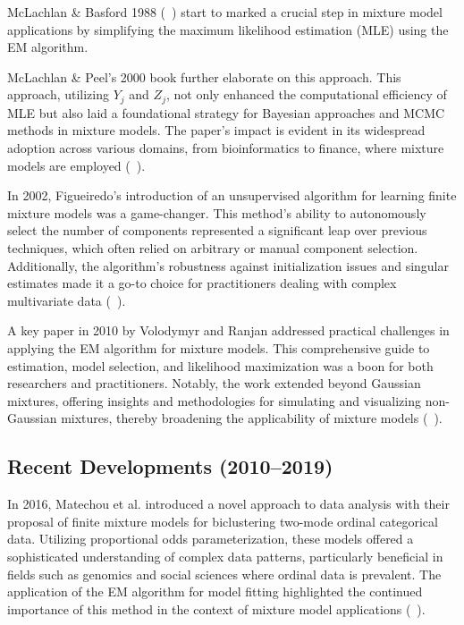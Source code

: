 \documentclass{article}
\begin{document}
McLachlan \& Basford 1988 (~\cite{mclachlan1988mixture}) start to marked a crucial step in mixture model applications by simplifying the maximum likelihood estimation (MLE) using the EM algorithm.

McLachlan \& Peel's 2000 book further elaborate on this approach. This approach, utilizing $Y_j$ and $Z_j$, not only enhanced the computational efficiency of MLE but also laid a foundational strategy for Bayesian approaches and MCMC methods in mixture models. The paper’s impact is evident in its widespread adoption across various domains, from bioinformatics to finance, where mixture models are employed (~\cite{mclachlan2000finite}).

In 2002, Figueiredo's introduction of an unsupervised algorithm for learning finite mixture models was a game-changer. This method's ability to autonomously select the number of components represented a significant leap over previous techniques, which often relied on arbitrary or manual component selection. Additionally, the algorithm's robustness against initialization issues and singular estimates made it a go-to choice for practitioners dealing with complex multivariate data (~\cite{figueiredo2002unsupervised}).

A key paper in 2010 by Volodymyr and Ranjan addressed practical challenges in applying the EM algorithm for mixture models. This comprehensive guide to estimation, model selection, and likelihood maximization was a boon for both researchers and practitioners. Notably, the work extended beyond Gaussian mixtures, offering insights and methodologies for simulating and visualizing non-Gaussian mixtures, thereby broadening the applicability of mixture models (~\cite{10.1214/09-SS053}).

\subsection*{Recent Developments (2010--2019)}

In 2016, Matechou et al. introduced a novel approach to data analysis with their proposal of finite mixture models for biclustering two-mode ordinal categorical data. Utilizing proportional odds parameterization, these models offered a sophisticated understanding of complex data patterns, particularly beneficial in fields such as genomics and social sciences where ordinal data is prevalent. The application of the EM algorithm for model fitting highlighted the continued importance of this method in the context of mixture model applications (~\cite{matechou2016biclustering}).
\end{document}
